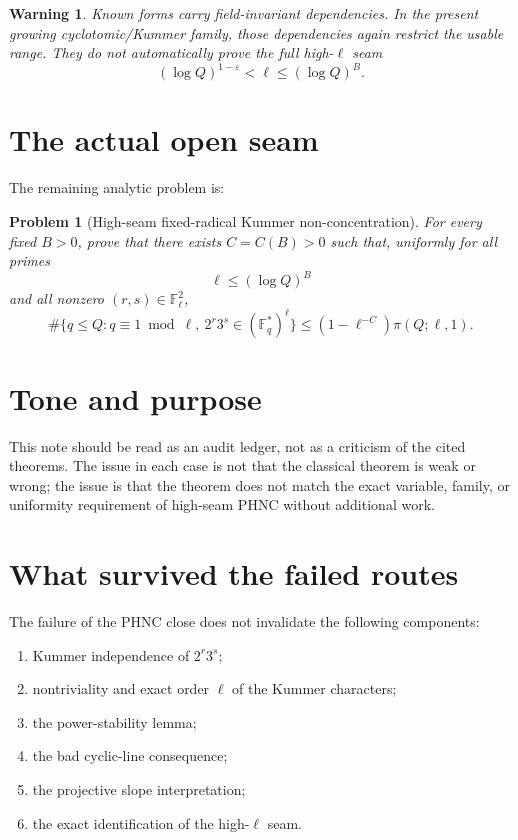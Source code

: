\documentclass[11pt]{article}
\newtheorem{warning}{Warning}
\newtheorem{problem}{Problem}
\newcommand{\F}{\mathbb F}
\newcommand{\1}{\mathbf 1}
\begin{document}
\begin{warning}
Known forms carry field-invariant dependencies.  In the present growing cyclotomic/Kummer family, those dependencies again restrict the usable range.  They do not automatically prove the full high-\(\ell\) seam
\[
(\log Q)^{1-\varepsilon}<\ell\le(\log Q)^B.
\]
\end{warning}

\section{The actual open seam}

The remaining analytic problem is:

\begin{problem}[High-seam fixed-radical Kummer non-concentration]
For every fixed \(B>0\), prove that there exists \(C=C(B)>0\) such that, uniformly for all primes
\[
\ell\le(\log Q)^B
\]
and all nonzero \((r,s)\in\F_\ell^2\),
\[
\#\{q\le Q:q\equiv1\bmod\ell,\ 2^r3^s\in(\F_q^*)^\ell\}
\le
(1-\ell^{-C})\pi(Q;\ell,1).
\]
\end{problem}




\section{Tone and purpose}

This note should be read as an audit ledger, not as a criticism of the cited theorems. The issue in each case is not that the classical theorem is weak or wrong; the issue is that the theorem does not match the exact variable, family, or uniformity requirement of high-seam PHNC without additional work.

\section{What survived the failed routes}

The failure of the PHNC close does not invalidate the following components:

\begin{enumerate}[leftmargin=1.5em]
\item Kummer independence of \(2^r3^s\);
\item nontriviality and exact order \(\ell\) of the Kummer characters;
\item the power-stability lemma;
\item the bad cyclic-line consequence;
\item the projective slope interpretation;
\item the exact identification of the high-\(\ell\) seam.
\end{enumerate}
\end{document}
